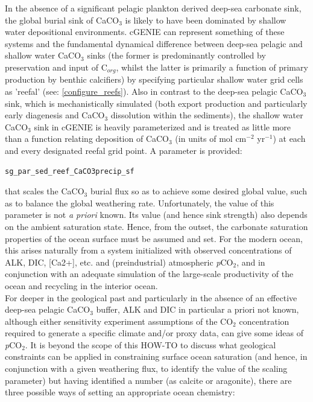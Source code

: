 \documentclass[11pt,fleqn]{book} %
\begin{document}
\noindent In the absence of a significant pelagic plankton derived deep-sea carbonate sink, the global burial sink of CaCO$_{3}$ is likely to have been dominated by shallow water depositional environments. cGENIE can represent something of these systems and the fundamental dynamical difference between deep-sea pelagic and shallow water CaCO$_{3}$ sinks (the former is predominantly controlled by preservation and input of C$_{org}$, whilst the latter is primarily a function of primary production by benthic calcifiers) by specifying particular shallow water grid cells as 'reefal' (see: \ref{configure_reefs}). Also in contrast to the deep-sea pelagic CaCO$_{3}$ sink, which is mechanistically simulated (both export production and particularly early diagenesis and CaCO$_{3}$ dissolution within the sediments), the shallow water CaCO$_{3}$ sink in cGENIE is heavily parameterized and is treated as little more than a function relating deposition of CaCO$_{3}$ (in units of mol cm$^{-2}$ yr$^{-1}$) at each and every designated reefal grid point. A parameter is provided:
\vspace{-1mm}\begin{verbatim}
sg_par_sed_reef_CaCO3precip_sf
\end{verbatim}\vspace{-1mm}
that scales the CaCO$_{3}$ burial flux so as to achieve some desired global value, such as to balance the global weathering rate. Unfortunately, the value of this parameter is not \textit{a priori} known. Its value (and hence sink strength) also depends on the ambient saturation state. Hence, from the outset, the carbonate saturation properties of the ocean surface must be assumed and set. For the modern ocean, this arises naturally from a system initialized with observed concentrations of ALK, DIC, [Ca2+], etc. and  (preindustrial) atmospheric \textit{p}CO\(_{2}\), and in conjunction with an adequate simulation of the large-scale productivity of the ocean and recycling in the interior ocean.
\\ For deeper in the geological past and particularly in the absence of an effective deep-sea pelagic CaCO$_{3}$ buffer, ALK and DIC in particular a priori not known, although either sensitivity experiment assumptions of the CO\(_{2}\) concentration required to generate a specific climate and/or proxy data, can give some ideas of \textit{p}CO\(_{2}\). It is beyond the scope of this HOW-TO to discuss what geological constraints can be applied in constraining surface ocean saturation (and hence, in conjunction with a given weathering flux, to identify the value of the scaling parameter) but having identified a number (as calcite or aragonite), there are three possible ways of setting an appropriate ocean chemistry:
\end{document}
